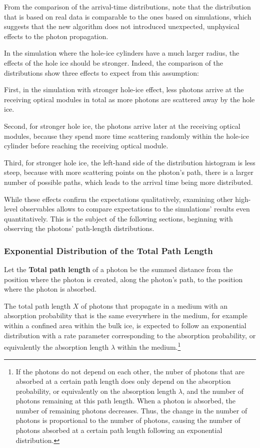 From the comparison of the arrival-time distributions, note that the distribution that is based on real data is comparable to the ones based on simulations, which suggests that the new algorithm does not introduced unexpected, unphysical effects to the photon propagation.


In the simulation where the hole-ice cylinders have a much larger radius, the effects of the hole ice should be stronger. Indeed, the comparison of the distributions show three effects to expect from this assumption:

First, in the simulation with stronger hole-ice effect, less photons arrive at the receiving optical modules in total as more photons are scattered away by the hole ice.

Second, for stronger hole ice, the photons arrive later at the receiving optical modules, because they spend more time scattering randomly within the hole-ice cylinder before reaching the receiving optical module.

Third, for stronger hole ice, the left-hand side of the distribution histogram is less steep, because with more scattering points on the photon's path, there is a larger number of possible paths, which leads to the arrival time being more distributed.

While these effects confirm the expectations qualitatively, examining other high-level observables allows to compare expectations to the simulations' results even quantitatively. This is the subject of the following sections, beginning with observing the photons' path-length distributions.


\subsubsection{Exponential Distribution of the Total Path Length}


Let the \textbf{Total path length} of a photon be the summed distance from the position where the photon is created, along the photon's path, to the position where the photon is absorbed.

The total path length $X$ of photons that propagate in a medium with an absorption probability that is the same everywhere in the medium, for example within a confined area within the bulk ice, is expected to follow an exponential distribution with a rate parameter corresponding to the absorption probability, or equivalently the absorption length $\lambda$ within the medium.\footnote{If the photons do not depend on each other, the nuber of photons that are absorbed at a certain path length does only depend on the absorption probability, or equivalently on the absorption length $\lambda$, and the number of photons remaining at this path length. When a photon is absorbed, the number of remaining photons decreases. Thus, the change in the number of photons is proportional to the number of photons, causing the number of photons absorbed at a certain path length following an exponential distribution.}

